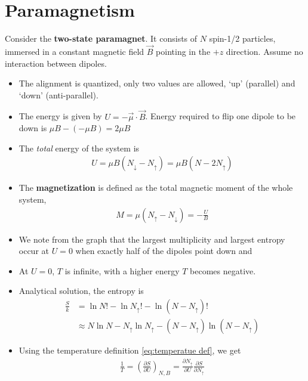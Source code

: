 \documentclass{book}
\begin{document}
\section{Paramagnetism}%
\label{sec:paramagnetism}

Consider the \textbf{two-state paramagnet}. It consists of $ N $ spin-1/2 particles, immersed in a constant
magnetic field $ \vec{B} $ pointing in the $ +z $ direction. Assume no interaction between dipoles.
\begin{itemize}
	\item The alignment is quantized, only two values are allowed, `up' (parallel) and `down' (anti-parallel).
	\item The energy is given by $ U = - \vec{\mu} \cdot \vec{B} $. Energy required to flip one dipole to be
	      down is $ \mu B - (-\mu B) = 2\mu B $
	\item The \textit{total} energy of the system is
	      \begin{align}
		      U = \mu B  (N_\downarrow - N_\uparrow)= \mu B(N - 2N_{\uparrow})
	      \end{align}
	\item The \textbf{magnetization} is defined as the total magnetic moment of the whole system,
	      \begin{align}
		      M = \mu (N_\uparrow - N_\downarrow) = - \frac{U}{B}
	      \end{align}
	\item We note from the graph that the largest multiplicity and largest entropy occur at $ U = 0 $ when exactly
	      half of the dipoles point down and
	\item At $ U = 0 $,	$ T $ is infinite, with a higher energy $ T $ becomes negative.
	\item Analytical solution, the entropy is
	      \begin{align}
		      \label{eq:entropy of paramg}
		      \frac{S}{k} & = \ln{N!} - \ln{N_\uparrow}! - \ln{(N - N_\uparrow)!}                                  \\
		                  & \approx N \ln{N} - N_\uparrow \ln{N_\uparrow} - (N - N_\uparrow) \ln{(N - N_\uparrow)}
	      \end{align}
	\item Using the temperature definition \eqref{eq:temperatue def}, we get
	      \begin{align}
		      \label{eq:temp of paramag}
		      \frac{1}{T} = \left( \frac{\partial S}{\partial U} \right)_{N, B}
		      = \frac{\partial N_\uparrow}{\partial U} \frac{\partial S}{\partial N_\uparrow}

\end{align}
\end{itemize}
\end{document}
